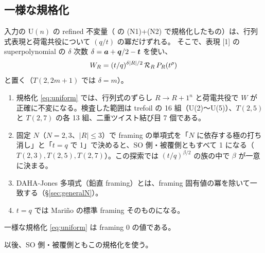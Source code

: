 \subsection{一様な規格化}\label{sec:uniform}
入力の U$(n)$ の refined 不変量（\cite{KN17} の (N1)+(N2) で規格化したもの）は、行列式表現と荷電共役について $(q/t)$ の冪だけずれる。
そこで、表現 [1] の superpolynomial の $\delta$ 次数 $\delta = \bm{a} + \bm{q}/2 - \bm{t}$ を使い、
\begin{equation}\label{eq:uniform}
W_R = (t/q)^{\delta |R|/2}\, \mathcal{R}_R\, P_R(t^\rho)
\end{equation}
と置く（$T(2,2m+1)$ では $\delta = m$）。

\begin{compresult}\label{cr:uniform}
\begin{enumerate}
\item 規格化 \eqref{eq:uniform} では、行列式のずらし $R \to R + 1^n$ と荷電共役で $W$ が正確に不変になる。検査した範囲は trefoil の 16 組（U(2)〜U(5)）、$T(2,5)$ と $T(2,7)$ の各 13 組、二重ツイスト結び目 7 個である。
\item 固定 $N$（$N = 2, 3$、$|R| \le 3$）で framing の単項式を「$N$ に依存する極の打ち消し」と「$t = q$ で 1」で決めると、SO 側・被覆側ともすべて 1 になる（$T(2,3), T(2,5), T(2,7)$）。この探索では $(t/q)^{\beta/2}$ の族の中で $\beta$ が一意に決まる。
\item DAHA-Jones 多項式（鉛直 framing）とは、framing 固有値の冪を除いて一致する（§\ref{sec:generalN}）。
\item $t = q$ では Mariño の標準 framing そのものになる。
\end{enumerate}
\end{compresult}

\begin{hypothesis}
一様な規格化 \eqref{eq:uniform} は framing 0 の値である。
\end{hypothesis}
以後、SO 側・被覆側ともこの規格化を使う。
